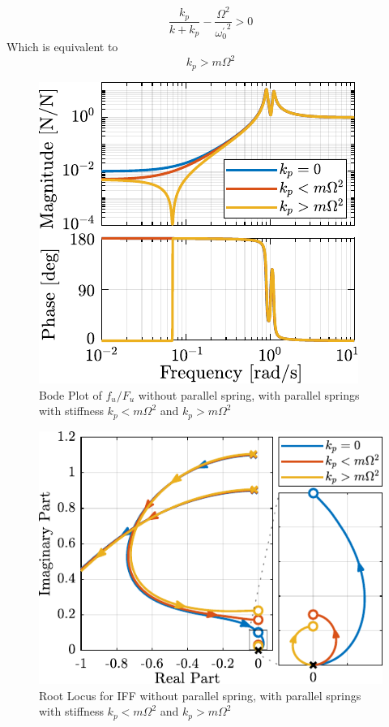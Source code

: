 \documentclass{ISMA_USD2020}
\begin{document}
\begin{equation}
  \frac{k_p}{k + k_p} - \frac{\Omega^2}{{\omega_0^\prime}^2} > 0
\end{equation}
Which is equivalent to
\begin{equation}
  k_p > m \Omega^2
\end{equation}

\begin{figure}[htbp]
\centering
\includegraphics[scale=1]{figs/plant_iff_kp.pdf}
\caption{\label{fig:plant_iff_kp}Bode Plot of \(f_u/F_u\) without parallel spring, with parallel springs with stiffness \(k_p < m \Omega^2\) and \(k_p > m \Omega^2\)}
\end{figure}

\begin{figure}[htbp]
\centering
\includegraphics[scale=1]{figs/root_locus_iff_kp.pdf}
\caption{\label{fig:root_locus_iff_kp}Root Locus for IFF without parallel spring, with parallel springs with stiffness \(k_p < m \Omega^2\) and \(k_p > m \Omega^2\)}
\end{figure}
\end{document}
